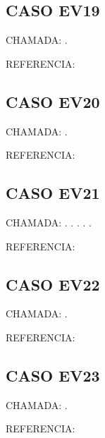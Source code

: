 \documentclass{undftex}
\begin{document}
\begin{refsection}\section*{CASO EV19} CHAMADA: . \textcite{ev19}\par REFERENCIA:\par\printbibliography[heading=none,check=undfconsultadas]\end{refsection}\clearpage
\begin{refsection}\section*{CASO EV20} CHAMADA: . \textcite{ev20a}\par REFERENCIA:\par\printbibliography[heading=none,check=undfconsultadas]\end{refsection}\clearpage
\begin{refsection}\section*{CASO EV21} CHAMADA: . \textcite{ev21b}. . . . \par REFERENCIA:\par\printbibliography[heading=none,check=undfconsultadas]\end{refsection}\clearpage
\begin{refsection}\section*{CASO EV22} CHAMADA: . \textcite{ev22}\par REFERENCIA:\par\printbibliography[heading=none,check=undfconsultadas]\end{refsection}\clearpage
\begin{refsection}\section*{CASO EV23} CHAMADA: . \textcite{ev23}\par REFERENCIA:\par\printbibliography[heading=none,check=undfconsultadas]\end{refsection}\clearpage
\end{document}
